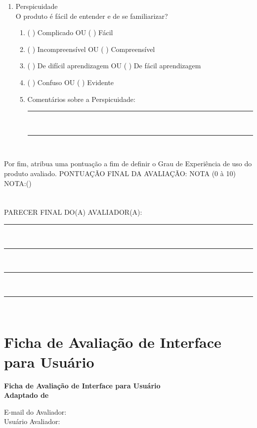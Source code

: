 \begin{apendicesenv}
\begin{enumerate}
    \item Perspicuidade\\O produto é fácil de entender e de se familiarizar?
    \begin{enumerate}
        \item ( ) Complicado OU ( ) Fácil
        \item ( ) Incompreensível OU ( ) Compreensível
        \item ( ) De difícil aprendizagem OU ( ) De fácil aprendizagem
        \item ( ) Confuso OU ( ) Evidente 
        \item Comentários sobre a Perspicuidade:\hrulefill \\       
        \rule{14cm}{.1pt}\\
        \rule{14cm}{.1pt}\\
        
    \end{enumerate}

    
\end{enumerate}

Por fim, atribua uma pontuação a fim de definir o Grau de Experiência de uso do produto avaliado.
PONTUAÇÃO FINAL DA AVALIAÇÃO: NOTA (0 à 10) NOTA:(\space\space\space\space)
\\
\\
\\
   PARECER FINAL DO(A) AVALIADOR(A):\hrulefill \\
        \rule{16cm}{.1pt}\\
        \rule{16cm}{.1pt}\\
        \rule{16cm}{.1pt}\\
        \rule{16cm}{.1pt}\\
        

















\chapter{Ficha de Avaliação de Interface para Usuário}

\begin{center}
\textbf{
Ficha de Avaliação de Interface para Usuário\\
Adaptado de 
}
\end{center}
E-mail do Avaliador: \hrulefill \\
Usuário Avaliador: \hrulefill \\


\end{apendicesenv}
